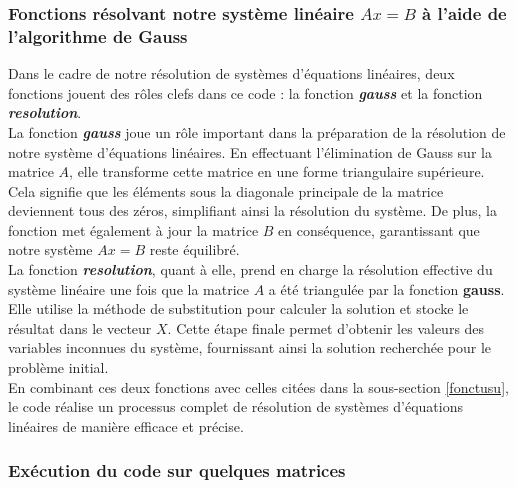 \documentclass{report}
\begin{document}
\subsubsection{Fonctions résolvant notre système linéaire $Ax=B$ à l'aide de l'algorithme de Gauss}
Dans le cadre de notre résolution de systèmes d'équations linéaires, deux fonctions jouent des rôles clefs dans ce code : la fonction \textit{\textbf{gauss}} et la fonction \textit{\textbf{resolution}}.\\

La fonction \textit{\textbf{gauss}} joue un rôle important dans la préparation de la résolution de notre système d'équations linéaires. En effectuant l'élimination de Gauss sur la matrice $A$, elle transforme cette matrice en une forme triangulaire supérieure. Cela signifie que les éléments sous la diagonale principale de la matrice deviennent tous des zéros, simplifiant ainsi la résolution du système. De plus, la fonction met également à jour la matrice $B$ en conséquence, garantissant que notre système $Ax=B$ reste équilibré.\\

La fonction \textit{\textbf{resolution}}, quant à elle, prend en charge la résolution effective du système linéaire une fois que la matrice $A$ a été triangulée par la fonction \textbf{gauss}. Elle utilise la méthode de substitution pour calculer la solution et stocke le résultat dans le vecteur $X$. Cette étape finale permet d'obtenir les valeurs des variables inconnues du système, fournissant ainsi la solution recherchée pour le problème initial.\\

En combinant ces deux fonctions avec celles citées dans la sous-section \ref{fonctusu}, le code réalise un processus complet de résolution de systèmes d'équations linéaires de manière efficace et précise.\\
\subsubsection{Exécution du code sur quelques matrices}
\end{document}
